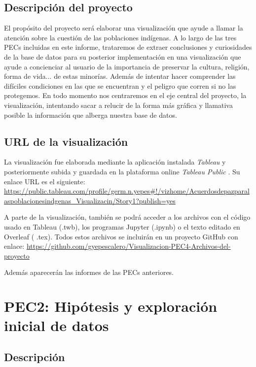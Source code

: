 \documentclass[11pt]{article}
\begin{document}
\subsection{Descripción del proyecto}

El propósito del proyecto será elaborar una visualización que ayude a llamar la atención sobre la cuestión de las poblaciones indígenas. A lo largo de las tres PECs incluidas en este informe, trataremos de extraer conclusiones y curiosidades de la base de datos para su posterior implementación en una visualización que ayude a concienciar al usuario de la importancia de preservar la cultura, religión, forma de vida... de estas minorías. Además de intentar hacer comprender las difíciles condiciones en las que se encuentran y el peligro que corren si no las protegemos. En todo momento nos centraremos en el eje central del proyecto, la visualización, intentando sacar a relucir de la forma más gráfica y llamativa posible la información que alberga nuestra base de datos.

\subsection{URL de la visualización}

La visualización fue elaborada mediante la aplicación instalada \emph{Tableau} \cite{tableau} y posteriormente
subida y guardada en la plataforma online \emph{Tableau Public} \cite{public}. Su enlace URL es el siguiente:
\url{https://public.tableau.com/profile/germ.n.yepes#!/vizhome/Acuerdosdepazparalaspoblacionesindgenas_Visualizacin/Story1?publish=yes}

A parte de la visualización, también se podrá acceder a los archivos con el código usado en Tableau (.twb), los programas Jupyter (.ipynb) o el texto editado en Overleaf ( .tex). Todos estos archivos se incluirán en un proyecto GitHub \cite{github} con enlace: 
\url{https://github.com/gyepescalero/Visualizacion-PEC4-Archivos-del-proyecto}

Además aparecerán las informes de las PECs anteriores.

\section{PEC2: Hipótesis y exploración inicial de datos}\label{PEC2}

\subsection{Descripción}
\end{document}
